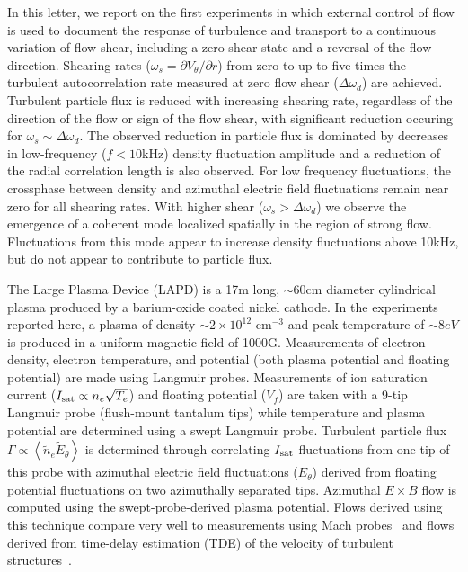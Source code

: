 \documentclass[aps,prl,amsmath,amssymb,preprint,superscriptaddress]{revtex4}
\begin{document}
In this letter, we report on the first experiments in which external control of flow is used to document the response of turbulence and transport to a continuous variation of flow shear, including a zero shear state and a reversal of the flow direction. Shearing rates ($\omega_{s}= \partial V_{\theta}/\partial r$) from
zero to up to five times the turbulent autocorrelation rate measured at zero flow shear ($\Delta \omega_{d}$) are achieved. Turbulent particle flux is reduced with increasing shearing rate, regardless of the direction of the flow or sign of the flow shear, with significant reduction occuring for $\omega_s \sim \Delta \omega_d$.  The observed reduction in particle flux is dominated by decreases in low-frequency ($f < 10$kHz) density fluctuation amplitude and a reduction of the
radial correlation length is also observed. For low frequency fluctuations, the crossphase between density and azimuthal electric field fluctuations remain near
zero for all shearing rates.  With higher shear ($\omega_s > \Delta \omega_d$) we observe the emergence of a coherent mode localized spatially in the region
of strong flow. Fluctuations from this mode appear to increase density fluctuations above 10kHz, but do not appear to contribute to particle flux.   

The Large Plasma Device \cite{gek91} (LAPD) is a 17m long, $\sim 60$cm
diameter cylindrical plasma produced by a barium-oxide coated nickel
cathode. In the experiments reported here, a plasma of density $\sim 2
\times 10^{12}$ cm$^{-3}$ and peak temperature of $\sim 8 eV$ is
produced in a uniform magnetic field of 1000G.  Measurements of 
electron density, electron temperature, and potential (both plasma
potential and floating potential) are made using Langmuir probes.  
Measurements of ion saturation current ($I_{\rm sat} \propto n_e \sqrt{T_e}$) and floating
potential ($V_f$) are taken with a 9-tip Langmuir probe (flush-mount
tantalum tips) while temperature and plasma potential are
determined using a swept Langmuir probe. Turbulent particle flux
$\Gamma \propto \left<\tilde{n}_e \tilde{E}_\theta\right>$ is
determined through correlating $I_{\rm sat}$ fluctuations from one tip
of this probe with
azimuthal electric field fluctuations ($E_\theta$) derived from
floating potential fluctuations on two azimuthally separated tips.
Azimuthal $E\times B$ flow is computed
using the swept-probe-derived plasma potential.  Flows derived using
this technique compare very well to measurements using
Mach probes~\cite{maggs07} and flows derived from time-delay
estimation (TDE) of the velocity of turbulent structures~\cite{holland04}.
  
\end{document}
